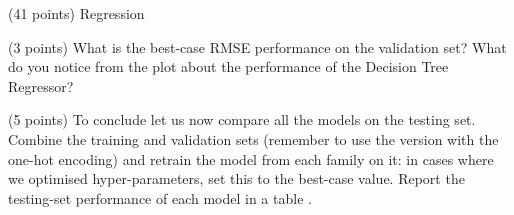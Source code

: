 \documentclass[12pt]{article}
\begin{document}
\begin{question}{\label{Q_LR_BA}(41 points) Regression}
\begin{subquestion}{(3 points) What is the best-case RMSE performance on the validation set? What do you notice from the plot about the performance of the Decision Tree Regressor?}



\end{subquestion}

\begin{subquestion}{(5 points) To conclude let us now compare all the models on the testing set. Combine the training and validation sets (remember to use the version with the one-hot encoding) and retrain the model from each family on it: in cases where we optimised hyper-parameters, set this to the best-case value. Report the testing-set performance of each model in a table .}






\end{subquestion}

\end{question}

\end{document}
